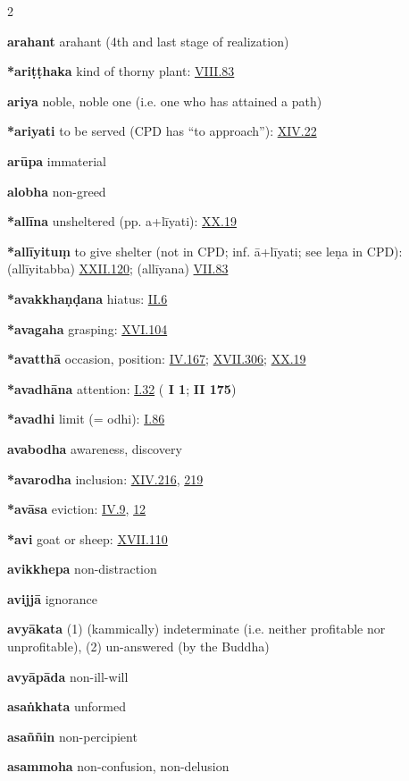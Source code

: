 \begin{multicols}{2}
\begin{vismHanging}
\par\textbf{arahant} arahant (4th and last stage of realization) 
\par\textbf{*ariṭṭhaka} kind of thorny plant: \hyperlink{VIII.83}{VIII.83}{}
\par\textbf{ariya} noble, noble one (i.e. one who has attained a path) 
\par\textbf{*ariyati} to be served (CPD has “to approach”): \hyperlink{XIV.22}{XIV.22}{} 
\par\textbf{arūpa} immaterial
\par\textbf{alobha} non-greed
\par\textbf{*allīna} unsheltered (pp. a+līyati): \hyperlink{XX.19}{XX.19}{}
\par\textbf{*allīyituṃ} to give shelter (not in CPD; inf. ā+līyati; see leṇa in CPD): (allīyitabba) \hyperlink{XXII.120}{XXII.120}{}; (allīyana) \hyperlink{VII.83}{VII.83}{}
\par\textbf{*avakkhaṇḍana} hiatus: \hyperlink{II.6}{II.6}{}
\par\textbf{*avagaha} grasping: \hyperlink{XVI.104}{XVI.104}{}
\par\textbf{*avatthā} occasion, position: \hyperlink{IV.167}{IV.167}{}; \hyperlink{XVII.306}{XVII.306}{}; \hyperlink{XX.19}{XX.19}{} 
\par\textbf{*avadhāna} attention: \hyperlink{I.32}{I.32}{} (\textbf{\cite{Paṭis} I 1}; \textbf{\cite{M} II 175}) 
\par\textbf{*avadhi} limit (= odhi): \hyperlink{I.86}{I.86}{}
\par\textbf{avabodha} awareness, discovery 
\par\textbf{*avarodha} inclusion: \hyperlink{XIV.216}{XIV.216}{}, \hyperlink{XIV.219}{219}{} 
\par\textbf{*avāsa} eviction: \hyperlink{IV.9}{IV.9}{}, \hyperlink{IV.12}{12}{}
\par\textbf{*avi} goat or sheep: \hyperlink{XVII.110}{XVII.110}{}
\par\textbf{avikkhepa} non-distraction
\par\textbf{avijjā} ignorance
\par\textbf{avyākata} (1) (kammically) indeterminate (i.e. neither profitable nor unprofitable), (2) un-answered (by the Buddha) 
\par\textbf{avyāpāda} non-ill-will
\par\textbf{asaṅkhata} unformed
\par\textbf{asaññin} non-percipient
\par\textbf{asammoha} non-confusion, non-delusion 

\end{vismHanging}
\end{multicols}
